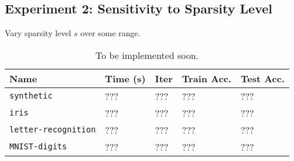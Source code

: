 \documentclass[11pt]{article}
\begin{document}
\subsection*{Experiment 2: Sensitivity to Sparsity Level}

Vary sparsity level $s$ over some range.

\begin{table}[!h]
    \centering
    \begin{tabular}{lllll}
        \toprule
        Name & Time (s) & Iter & Train Acc. & Test Acc. \\
        \midrule
        \texttt{synthetic} & ??? & ??? & ??? & ??? \\
        \texttt{iris} & ??? & ??? & ??? & ??? \\
        \texttt{letter-recognition} & ??? & ??? & ??? & ??? \\
        \texttt{MNIST-digits} & ??? & ??? & ??? & ??? \\
        \bottomrule
    \end{tabular}
    \caption{To be implemented soon.}
\end{table}
\end{document}
